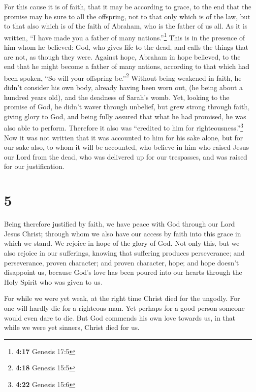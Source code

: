  For this cause it is of faith, that it may be according
to grace, to the end that the promise may be sure to all the offspring,
not to that only which is of the law, but to that also which is of the
faith of Abraham, who is the father of us all.  As it is
written, ``I have made you a father of many nations.''\footnote{\textbf{4:17}
  Genesis 17:5} This is in the presence of him whom he believed: God,
who gives life to the dead, and calls the things that are not, as though
they were.  Against hope, Abraham in hope believed, to
the end that he might become a father of many nations, according to that
which had been spoken, ``So will your offspring be.''\footnote{\textbf{4:18}
  Genesis 15:5}  Without being weakened in faith, he
didn't consider his own body, already having been worn out, (he being
about a hundred years old), and the deadness of Sarah's womb.
 Yet, looking to the promise of God, he didn't waver
through unbelief, but grew strong through faith, giving glory to God,
 and being fully assured that what he had promised, he
was also able to perform.  Therefore it also was
``credited to him for righteousness.''\footnote{\textbf{4:22} Genesis
  15:6}  Now it was not written that it was accounted to
him for his sake alone,  but for our sake also, to whom
it will be accounted, who believe in him who raised Jesus our Lord from
the dead,  who was delivered up for our trespasses, and
was raised for our justification.

\hypertarget{section-4}{%
\section{5}\label{section-4}}

 Being therefore justified by faith, we have peace with
God through our Lord Jesus Christ;  through whom we also
have our access by faith into this grace in which we stand. We rejoice
in hope of the glory of God.  Not only this, but we also
rejoice in our sufferings, knowing that suffering produces perseverance;
 and perseverance, proven character; and proven character,
hope;  and hope doesn't disappoint us, because God's love
has been poured into our hearts through the Holy Spirit who was given to
us.

 For while we were yet weak, at the right time Christ died
for the ungodly.  For one will hardly die for a righteous
man. Yet perhaps for a good person someone would even dare to die.
 But God commends his own love towards us, in that while
we were yet sinners, Christ died for us.

